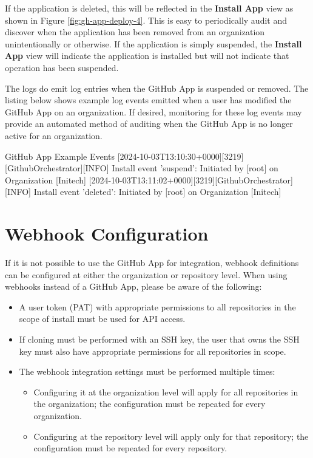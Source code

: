 If the \cxoneflow application is deleted, this will be reflected in the \textbf{Install App} view as shown in Figure \ref{fig:gh-app-deploy-4}.
This is easy to periodically audit and discover when the application has been removed from an organization unintentionally or otherwise.
If the application is simply suspended, the \textbf{Install App} view will indicate the application is installed but will not indicate
that operation has been suspended.

The \cxoneflow logs do emit log entries when the GitHub App is suspended or removed. The listing below shows example log events
emitted when a user has modified the GitHub App on an organization.  If desired, monitoring for these log events may provide
an automated method of auditing when the GitHub App is no longer active for an organization.

\begin{code}{GitHub App Example Events}{}{}
[2024-10-03T13:10:30+0000][3219][GithubOrchestrator][INFO] Install event 'suspend': Initiated by [root] on Organization [Initech]
[2024-10-03T13:11:02+0000][3219][GithubOrchestrator][INFO] Install event 'deleted': Initiated by [root] on Organization [Initech]
\end{code}

\section{Webhook Configuration}

If it is not possible to use the GitHub App for \cxoneflow integration, webhook definitions can be configured at either the
organization or repository level.  When using webhooks instead of a GitHub App, please be aware of the following:

\begin{itemize}
    \item A user token (PAT) with appropriate permissions to all repositories in the scope of install must be used for API access.
    \item If cloning must be performed with an SSH key, the user that owns the SSH key must also have appropriate permissions for
    all repositories in scope.
    \item The webhook integration settings must be performed multiple times:
    \begin{itemize}
        \item Configuring it at the organization level will apply for all repositories in the organization; the configuration must be repeated for
        every organization.
        \item Configuring at the repository level will apply only for that repository; the configuration must be repeated for every
        repository.
    \end{itemize}
\end{itemize}

